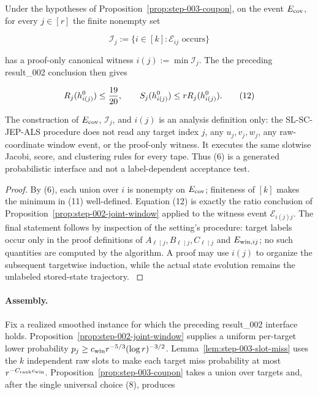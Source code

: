 \begin{proposition}\label{prop:step-003-witness-interface}
Under the hypotheses of Proposition~\ref{prop:step-003-coupon}, on the
event \(E_{\rm cov}\), for every \(j\in[r]\) the finite nonempty set

\[
\mathcal I_j:=\{i\in[k]:\mathscr E_{ij}\text{ occurs}\}
\tag{11}
\]

has a proof-only canonical witness \(i(j):=\min\mathcal I_j\). The
the preceding result\_002 conclusion then gives

\[
R_j(h_{i(j)}^0)\le{19\over20},\qquad
S_j(h_{i(j)}^0)\le rR_j(h_{i(j)}^0).
\tag{12}
\]

The construction of \(E_{\rm cov}\), \(\mathcal I_j\), and \(i(j)\) is an
analysis definition only: the SL-SC-JEP-ALS procedure does not read any
target index \(j\), any \(u_j,v_j,w_j\), any raw-coordinate window event, or
the proof-only witness. It executes the same slotwise Jacobi, score, and
clustering rules for every tape. Thus (6) is a generated probabilistic
interface and not a label-dependent acceptance test.

\begin{proof}
By (6), each union over \(i\) is nonempty on \(E_{\rm cov}\); finiteness of
\([k]\) makes the minimum in (11) well-defined. Equation (12) is exactly
the ratio conclusion of Proposition~\ref{prop:step-002-joint-window} applied
to the witness event \(\mathscr E_{i(j)j}\). The final statement follows by
inspection of the setting's procedure: target labels occur only in the
proof definitions of \(A_{\ell\mid j},B_{\ell\mid j},C_{\ell\mid j}\) and
\(E_{{\rm win},ij}\); no such quantities are computed by the algorithm. A
proof may use \(i(j)\) to organize the subsequent targetwise induction,
while the actual state evolution remains the unlabeled stored-state
trajectory. \(\)

\end{proof}
\end{proposition}
\paragraph{Assembly.}

Fix a realized smoothed instance for which the preceding result\_002 interface
holds. Proposition~\ref{prop:step-002-joint-window} supplies a uniform
per-target lower probability \(p_j\ge c_{\rm win}r^{-5/3}(\log r)^{-3/2}\).
Lemma~\ref{lem:step-003-slot-miss} uses the \(k\) independent raw slots to
make each target miss probability at most \(r^{-C_{\rm rank}c_{\rm win}}\).
Proposition~\ref{prop:step-003-coupon} takes a union over targets and, after
the single universal choice (8), produces

